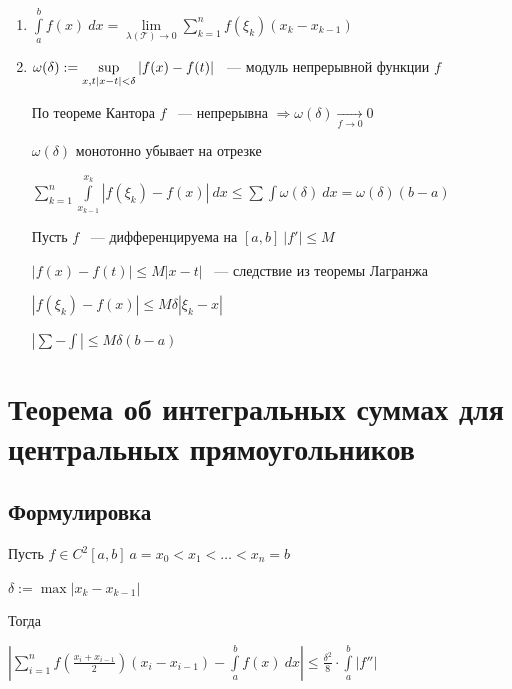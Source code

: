 \documentclass{article}
\begin{document}
			\begin{enumerate}

				\item $\int\limits^b_a f(x) \ dx = \lim\limits_{\lambda (\mathcal{T}) \rightarrow 0} \sum\limits^n_{k = 1} f(\xi_k)(x_k - x_{k - 1})$

				\item $\omega(\delta) := \sup\limits_{x, t \\ \left| x - t \right| < \delta} \left| f(x) - f(t) \right|$ ~--- модуль непрерывной функции $f$

					По теореме Кантора $f$ ~--- непрерывна $\Longrightarrow \omega(\delta) \xrightarrow[f \rightarrow 0]{} 0$
					
					$\omega(\delta)$ монотонно убывает на отрезке

					$\sum\limits^n_{k = 1} \int\limits^{x_k}_{x_{k - 1}} \left| f(\xi_k) - f(x) \right| \ dx \leq \sum \int \omega(\delta) \ dx = \omega(\delta) (b - a)$

					Пусть $f$ ~--- дифференцируема на $[a, b] \ \left| f' \right| \leq M$

					$\left| f(x) - f(t) \right| \leq M \left| x - t \right|$ ~--- следствие из теоремы Лагранжа

					$\left| f(\xi_k) - f(x) \right| \leq M \delta \left| \xi_k - x \right|$

					$\left| \sum - \int \right| \leq M \delta (b - a)$
				
			\end{enumerate}

	\newpage

	\section{Теорема об интегральных суммах для центральных прямоугольников}

		\subsection{Формулировка}

			Пусть $f \in C^2[a, b] \ a = x_0 < x_1 < \ldots < x_n = b$

			$\delta := \max \left| x_k - x_{k - 1} \right|$

			Тогда 

			$\left| \sum\limits^n_{i = 1} f \left( \frac{x_i + x_{i - 1}}{2} \right) (x_i - x_{i - 1}) - \int\limits^b_a f(x) \ dx \right| \leq \frac{\delta^2}{8} \cdot \int\limits^b_a |f''|$
\end{document}
